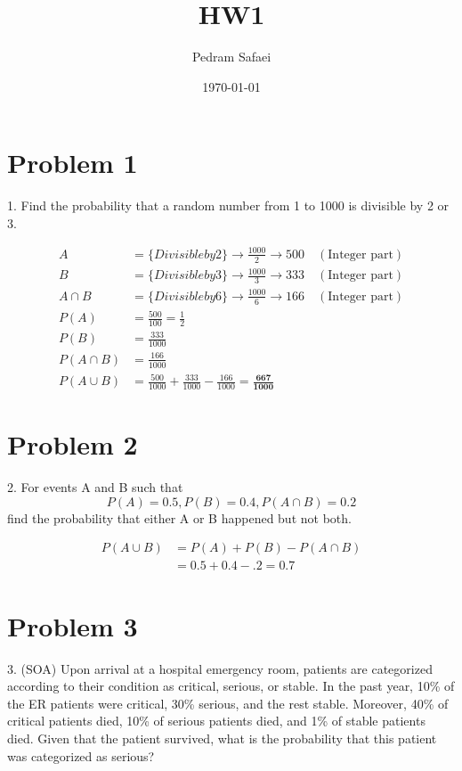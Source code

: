 \documentclass{article}
\title{HW1}
\date{\today}
\author{Pedram Safaei}
\begin{document}
	\maketitle
	\newpage
	
	\section*{Problem 1} 
	
	1. Find the probability that a random number from 1 to 1000 is divisible by 2 or 3.
	
	
	\begin{align*} 
	A &= \{Divisible by 2\}  \rightarrow \frac {1000}{2} \rightarrow 500 \quad (\text{Integer part})\\
	B &= \{Divisible by 3\}  \rightarrow \frac {1000}{3} \rightarrow 333 \quad (\text{Integer part})\\
	A \cap B &= \{Divisible by 6\}  \rightarrow \frac {1000}{6} \rightarrow 166  \quad (\text{Integer part})\\
	P(A) &= \frac{500}{100} = \frac{1}{2}\\
	P(B) &= \frac{333}{1000}\\
	P(A \cap B) &= \frac{166}{1000}\\
	P(A \cup B) &= \frac{500}{1000} + \frac{333}{1000} - \frac{166}{1000} = \boldsymbol{\frac{667}{1000}}
	\end{align*}
	
	
	\section*{Problem 2} 
	2. For events A and B such that 
	\begin{equation*}
	P ( A ) = 0.5 , P ( B ) = 0.4 , P ( A \cap B ) = 0.2 
	\end{equation*}
	find the probability that either A or B happened but not both.
	
	\begin{align*}
	P(A \cup B) &= P(A) + P(B)  - P(A \cap B)\\
	&= 0.5 + 0.4 - .2 = \boldsymbol{0.7}
	\end{align*}
	
	\section*{Problem 3} 
	3. (SOA) Upon arrival at a hospital emergency room, patients are categorized according to their condition as critical, serious, or stable. In the past year, 10\% of the ER patients were critical, 30\% serious, and the rest stable. Moreover, 40\% of critical patients died, 10\% of serious patients died, and 1\% of stable patients died. Given that the patient survived, what is the probability that this patient was categorized as serious?
	
\end{document}
